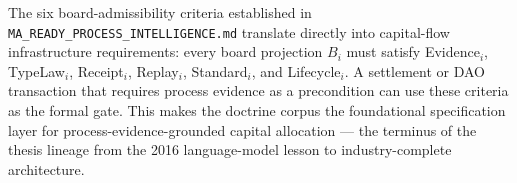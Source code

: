 The six board-admissibility criteria established in \texttt{MA\_READY\_PROCESS\_INTELLIGENCE.md}
translate directly into capital-flow infrastructure requirements: every board projection
$B_i$ must satisfy Evidence$_i$, TypeLaw$_i$, Receipt$_i$, Replay$_i$, Standard$_i$, and
Lifecycle$_i$. A settlement or DAO transaction that requires process evidence as a
precondition can use these criteria as the formal gate. This makes the doctrine corpus the
foundational specification layer for process-evidence-grounded capital allocation ---
the terminus of the thesis lineage from the 2016 language-model lesson to industry-complete
architecture.
